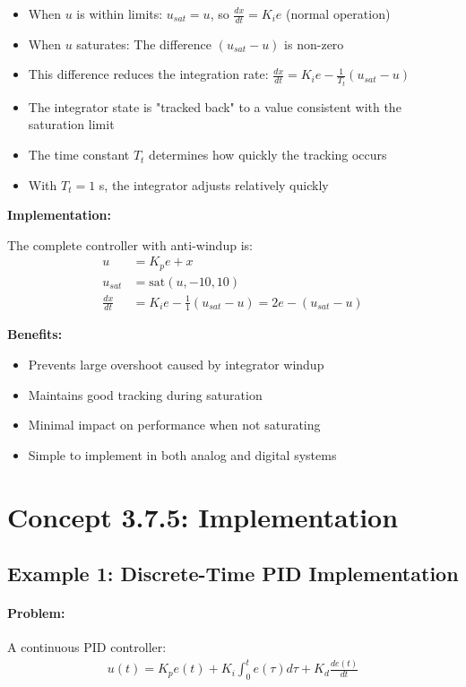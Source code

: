 \documentclass[11pt,a4paper]{article}
\begin{document}
\begin{itemize}
\item When $u$ is within limits: $u_{sat} = u$, so $\frac{dx}{dt} = K_i e$ (normal operation)
\item When $u$ saturates: The difference $(u_{sat} - u)$ is non-zero
\item This difference reduces the integration rate: $\frac{dx}{dt} = K_i e - \frac{1}{T_t}(u_{sat} - u)$
\item The integrator state is "tracked back" to a value consistent with the saturation limit
\item The time constant $T_t$ determines how quickly the tracking occurs
\item With $T_t = 1$ s, the integrator adjusts relatively quickly
\end{itemize}

\textbf{Implementation:}

The complete controller with anti-windup is:
\begin{align}
u &= K_p e + x \\
u_{sat} &= \text{sat}(u, -10, 10) \\
\frac{dx}{dt} &= K_i e - \frac{1}{1}(u_{sat} - u) = 2e - (u_{sat} - u)
\end{align}

\textbf{Benefits:}
\begin{itemize}
\item Prevents large overshoot caused by integrator windup
\item Maintains good tracking during saturation
\item Minimal impact on performance when not saturating
\item Simple to implement in both analog and digital systems
\end{itemize}

\section{Concept 3.7.5: Implementation}

\subsection{Example 1: Discrete-Time PID Implementation}

\paragraph{Problem:} A continuous PID controller:
\begin{align}
u(t) = K_p e(t) + K_i \int_0^t e(\tau)d\tau + K_d \frac{de(t)}{dt}
\end{align}
\end{document}
